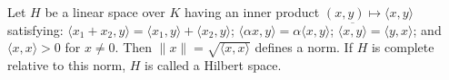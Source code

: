 Let $H$ be a linear space over $K$ having an inner product $(x, y) \mapsto \langle x, y \rangle$ satisfying: $\langle x_1 + x_2, y \rangle = \langle x_1, y \rangle + \langle x_2, y \rangle$; $\langle \alpha x, y \rangle = \alpha \langle x, y \rangle$; $\overline{\langle x, y \rangle} = \langle y, x \rangle$; and $\langle x, x \rangle > 0$ for $x \neq 0$. Then $\|x\| = \sqrt{\langle x, x \rangle}$ defines a norm. If $H$ is complete relative to this norm, $H$ is called a Hilbert space.
